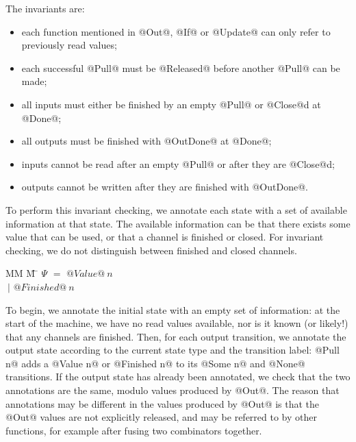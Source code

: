 The invariants are:
\begin{itemize}
\item each function mentioned in @Out@, @If@ or @Update@ can only refer to previously read values;
\item each successful @Pull@ must be @Released@ before another @Pull@ can be made;
\item all inputs must either be finished by an empty @Pull@ or @Close@d at @Done@;
\item all outputs must be finished with @OutDone@ at @Done@;
\item inputs cannot be read after an empty @Pull@ or after they are @Close@d;
\item outputs cannot be written after they are finished with @OutDone@.
\end{itemize}

To perform this invariant checking, we annotate each state with a set of available information at that state.
The available information can be that there exists some value that can be used, or that a channel is finished or closed.
For invariant checking, we do not distinguish between finished and closed channels.

\begin{tabbing}
MM \= M \= \kill
$\Psi$ \> $=$  \> $@Value@~n$ \\
       \> $~|$ \> $@Finished@~n$ \\
\end{tabbing}

To begin, we annotate the initial state with an empty set of information: at the start of the machine, we have no read values available, nor is it known (or likely!) that any channels are finished.
Then, for each output transition, we annotate the output state according to the current state type and the transition label: @Pull n@ adds a @Value n@ or @Finished n@ to its @Some n@ and @None@ transitions.
If the output state has already been annotated, we check that the two annotations are the same, modulo values produced by @Out@.
The reason that annotations may be different in the values produced by @Out@ is that the @Out@ values are not explicitly released, and may be referred to by other functions, for example after fusing two combinators together.



